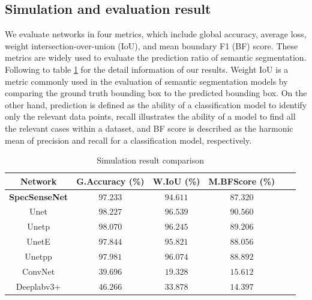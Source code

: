 \documentclass[journal]{IEEEtran} %
\begin{document}
\subsection{Simulation and evaluation result}
We evaluate networks in four metrics, which include global accuracy, average loss, weight intersection-over-union (IoU), and mean boundary F1 (BF) score. These metrics are widely used to evaluate the prediction ratio of semantic segmentation. Following to table \ref{tab3} for the detail information of our results. Weight IoU is a metric commonly used in the evaluation of semantic segmentation models by comparing the ground truth bounding box to the predicted bounding box. On the other hand, prediction is defined as the ability of a classification model to identify only the relevant data points, recall illustrates the ability of a model to find all the relevant cases within a dataset, and BF score is described as the harmonic mean of precision and recall for a classification model, respectively.

\begin{table}[!t]
\centering
\caption{Simulation result comparison}
\label{tab3}
\begin{tabular}{|c|c|c|c|c|c|}
\hline
\textbf{Network}  & \textbf{G.Accuracy (\%)} & \textbf{W.IoU (\%)} & \textbf{M.BFScore (\%)} \\
\hline
\textbf{SpecSenseNet}  & $97.233$  & $94.611$ & $87.320$  \\
Unet   & $98.227$   &  $96.539$ & $90.560$ \\
Unetp   & $98.070$   &  $96.245$ & $89.206$ \\
UnetE   & $97.844$   & $95.821$  & $88.056$ \\
Unetpp   & $97.981$   & $96.074$ & $88.892$ \\
ConvNet   & $39.696$  & $19.328$ & $15.612$ \\
Deeplabv3+   & $46.266$  &  $33.878$ & $14.397$ \\
\hline
\end{tabular}
\end{table}
\end{document}
